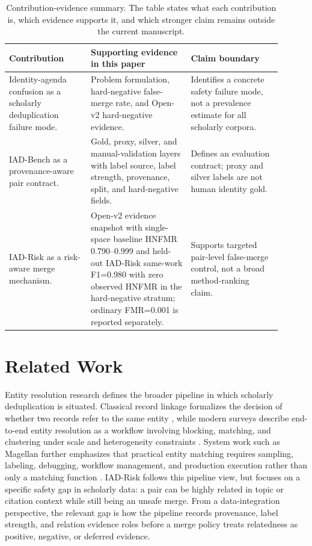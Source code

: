 \documentclass[preprint,12pt]{elsarticle}
\begin{document}
\begin{table}[H]
\caption{Contribution-evidence summary. The table states what each contribution is, which evidence supports it, and which stronger claim remains outside the current manuscript.}
\label{tab:contribution-evidence-summary}
\centering
\footnotesize
\setlength{\tabcolsep}{3pt}
\begin{tabular}{L{0.27\linewidth}L{0.33\linewidth}L{0.30\linewidth}}
\toprule
Contribution & Supporting evidence in this paper & Claim boundary \\
\midrule
Identity-agenda confusion as a scholarly deduplication failure mode. & Problem formulation, hard-negative false-merge rate, and Open-v2 hard-negative evidence. & Identifies a concrete safety failure mode, not a prevalence estimate for all scholarly corpora. \\
IAD-Bench as a provenance-aware pair contract. & Gold, proxy, silver, and manual-validation layers with label source, label strength, provenance, split, and hard-negative fields. & Defines an evaluation contract; proxy and silver labels are not human identity gold. \\
IAD-Risk as a risk-aware merge mechanism. & Open-v2 evidence snapshot with single-space baseline HNFMR 0.790--0.999 and held-out IAD-Risk same-work F1=0.980 with zero observed HNFMR in the hard-negative stratum; ordinary FMR=0.001 is reported separately. & Supports targeted pair-level false-merge control, not a broad method-ranking claim. \\
\bottomrule
\end{tabular}
\end{table}

\section{Related Work}

Entity resolution research defines the broader pipeline in which scholarly deduplication is situated. Classical record linkage formalizes the decision of whether two records refer to the same entity \citep{fellegi1969record}, while modern surveys describe end-to-end entity resolution as a workflow involving blocking, matching, and clustering under scale and heterogeneity constraints \citep{christophides2020endtoend}. System work such as Magellan further emphasizes that practical entity matching requires sampling, labeling, debugging, workflow management, and production execution rather than only a matching function \citep{konda2016magellan}. IAD-Risk follows this pipeline view, but focuses on a specific safety gap in scholarly data: a pair can be highly related in topic or citation context while still being an unsafe merge. From a data-integration perspective, the relevant gap is how the pipeline records provenance, label strength, and relation evidence roles before a merge policy treats relatedness as positive, negative, or deferred evidence.
\end{document}
